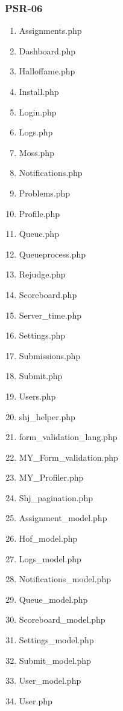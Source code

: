 \subsubsection{PSR-06}
\begin{enumerate}
	\item Assignments.php
	\item Dashboard.php
	\item Halloffame.php
	\item Install.php
	\item Login.php
	\item Logs.php
	\item Moss.php
	\item Notifications.php
	\item Problems.php
	\item Profile.php
	\item Queue.php
	\item Queueprocess.php
	\item Rejudge.php
	\item Scoreboard.php
	\item Server\_time.php
	\item Settings.php
	\item Submissions.php
	\item Submit.php
	\item Users.php
	\item shj\_helper.php
	\item form\_validation\_lang.php
	\item MY\_Form\_validation.php
	\item MY\_Profiler.php
	\item Shj\_pagination.php
	\item Assignment\_model.php
	\item Hof\_model.php
	\item Logs\_model.php
	\item Notifications\_model.php
	\item Queue\_model.php
	\item Scoreboard\_model.php
	\item Settings\_model.php
	\item Submit\_model.php
	\item User\_model.php
	\item User.php
\end{enumerate}


